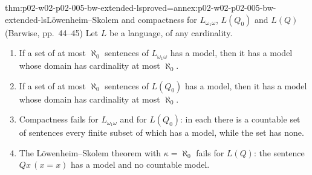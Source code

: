 \begin{hbtheorem}{thm:p02-w02-p02-005-bw-extended-ls}{proved=annex:p02-w02-p02-005-bw-extended-ls}{L\"owenheim--Skolem and compactness for \(L_{\omega_1\omega}\), \(L(Q_0)\) and \(L(Q)\) (Barwise, pp.~44--45)}
Let \(L\) be a language, of any cardinality.
\begin{enumerate}
\item If a set of at most \(\aleph_0\) sentences of \(L_{\omega_1\omega}\)
      has a model, then it has a model whose domain has cardinality at most
      \(\aleph_0\).
\item If a set of at most \(\aleph_0\) sentences of \(L(Q_0)\) has a model,
      then it has a model whose domain has cardinality at most \(\aleph_0\).
\item Compactness fails for \(L_{\omega_1\omega}\) and for \(L(Q_0)\): in each
      there is a countable set of sentences every finite subset of which has
      a model, while the set has none.
\item The L\"owenheim--Skolem theorem with \(\kappa=\aleph_0\) fails for
      \(L(Q)\): the sentence \(Qx\,(x=x)\) has a model and no countable model.
\end{enumerate}
\end{hbtheorem}

